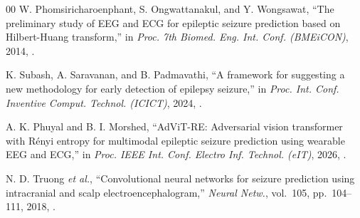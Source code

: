 \documentclass[conference,a4paper]{IEEEtran}
\begin{document}
\begin{thebibliography}{00}
 W. Phomsiricharoenphant, S.
Ongwattanakul, and Y. Wongsawat, ``The preliminary study of EEG and ECG for
epileptic seizure prediction based on Hilbert-Huang transform,'' in
\textit{Proc. 7th Biomed. Eng. Int. Conf. (BMEiCON)}, 2014,
.

 K. Subash, A. Saravanan, and B. Padmavathi, ``A
framework for suggesting a new methodology for early detection of epilepsy
seizure,'' in \textit{Proc. Int. Conf. Inventive Comput. Technol. (ICICT)},
2024, .

 A. K. Phuyal and B. I. Morshed, ``AdViT-RE:
Adversarial vision transformer with R\'enyi entropy for multimodal epileptic
seizure prediction using wearable EEG and ECG,'' in \textit{Proc. IEEE Int.
Conf. Electro Inf. Technol. (eIT)}, 2026,
.

 N. D. Truong \textit{et al.}, ``Convolutional neural
networks for seizure prediction using intracranial and scalp
electroencephalogram,'' \textit{Neural Netw.}, vol.~105, pp.~104--111, 2018,
.
\end{thebibliography}
\end{document}
